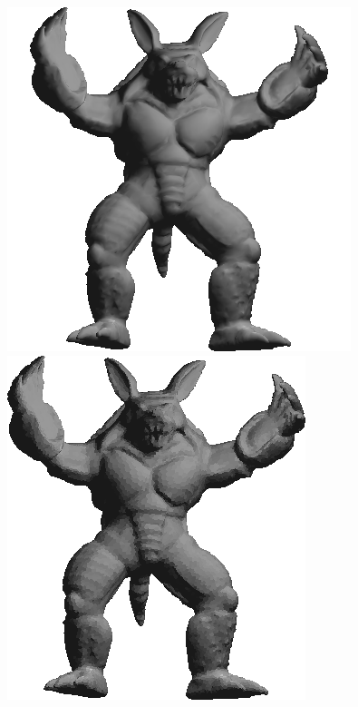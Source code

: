 \begin{figure}[!h]
    \includegraphics[scale=0.6]{images/armadillo-gs.png}
    \endminipage\hfill
    \centering
    \includegraphics[scale=0.6]{images/armadillo-efs.png}
    \endminipage\hfill
    \centering

\end{figure}

